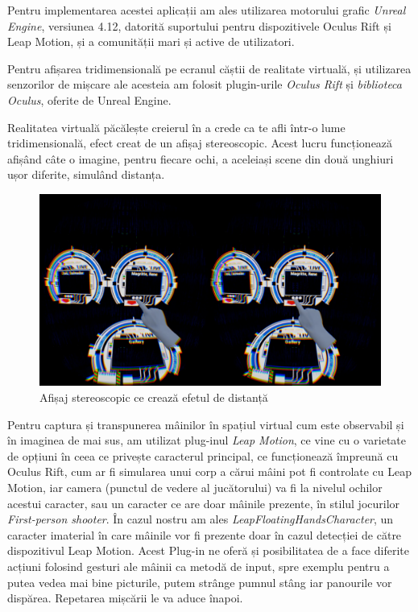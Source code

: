 Pentru implementarea acestei aplicații am ales utilizarea motorului grafic \textit{Unreal Engine}, versiunea 4.12, datorită suportului pentru dispozitivele Oculus Rift și Leap Motion, și a comunității mari și active de utilizatori.

Pentru afișarea tridimensională pe ecranul căștii de realitate virtuală, și utilizarea senzorilor de mișcare ale acesteia am folosit plugin-urile \textit{Oculus Rift} și \textit{biblioteca Oculus}, oferite de Unreal Engine.

Realitatea virtuală păcălește creierul în a crede ca te afli într-o lume tridimensională, efect creat de un afișaj stereoscopic. Acest lucru funcționează afișând câte o imagine, pentru fiecare ochi, a aceleiași scene din două unghiuri ușor diferite, simulând distanța.

\begin{figure}[h]
  \centering
  \includegraphics[scale=0.28]{img/stereoscopic.png}
  \caption{Afișaj stereoscopic ce crează efetul de distanță}
\end{figure}

Pentru captura și transpunerea mâinilor în spațiul virtual cum este observabil și în imaginea de mai sus, am utilizat plug-inul \textit{Leap Motion}, ce vine cu o varietate de opțiuni în ceea ce privește caracterul principal, ce funcționează împreună cu Oculus Rift, cum ar fi simularea unui corp a cărui mâini pot fi controlate cu Leap Motion, iar camera (punctul de vedere al jucătorului) va fi la nivelul ochilor acestui caracter, sau un caracter ce are doar mâinile prezente, în stilul jocurilor \textit{First-person shooter}. 
În cazul nostru am ales \textit{LeapFloatingHandsCharacter}, un caracter imaterial în care mâinile vor fi prezente doar în cazul detecției de către dispozitivul Leap Motion. Acest Plug-in ne oferă și posibilitatea de a face diferite acțiuni folosind gesturi ale mâinii ca metodă de input, spre exemplu pentru a putea vedea mai bine picturile, putem strânge pumnul stâng iar panourile vor dispărea. Repetarea mișcării le va aduce înapoi.


